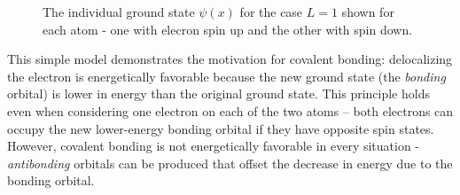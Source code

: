 \documentclass{article}
\begin{document}
\begin{figure}[h]
\centering
{}%
\qquad
{}%
\caption{The individual ground state $\psi(x)$ for the case $L = 1$ shown for each atom - one with elecron spin up and the other with spin down.}
\end{figure}

This simple model demonstrates the motivation for covalent bonding: delocalizing the electron is energetically favorable
because the new ground state (the \emph{bonding} orbital) is lower in energy than the original ground state. This principle holds even when considering one electron on each of the two atoms -- both electrons can occupy the new lower-energy bonding orbital if they have opposite spin states. However, covalent bonding is not energetically favorable in every situation - \emph{antibonding} orbitals can be produced that offset the decrease in energy due to the bonding orbital.
\end{document}
